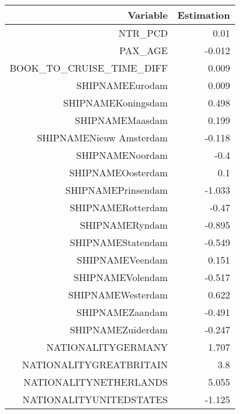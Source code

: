 \documentclass{article}
\begin{document}
\begin{table}[H]
	\centering 
	\begin{tabular}{rr}
		Variable & Estimation \\
		\hline 
		\hline 
		NTR\_PCD         	  &         0.01            \\      
		PAX\_AGE              	  &           -0.012        \\          
		BOOK\_TO\_CRUISE\_TIME\_DIFF  &              0.009      \\            
		SHIPNAMEEurodam	          &        0.009            \\      
		SHIPNAMEKoningsdam	  &         0.498           \\       
		SHIPNAMEMaasdam           &      	0.199       \\           
		SHIPNAMENieuw Amsterdam   &      	-0.118      \\            
		SHIPNAMENoordam	          &           -0.4          \\        
		SHIPNAMEOosterdam	  &          0.1            \\      
		SHIPNAMEPrinsendam	  &        -1.033           \\       
		SHIPNAMERotterdam         &    	-0.47               \\   
		SHIPNAMERyndam	          &         -0.895          \\        
		SHIPNAMEStatendam	  &         -0.549          \\        
		SHIPNAMEVeendam	          &         0.151           \\                            
		SHIPNAMEVolendam	  &       -0.517            \\                           
		SHIPNAMEWesterdam	  &       0.622             \\                          
		SHIPNAMEZaandam	          &     -0.491              \\                         
		SHIPNAMEZuiderdam	  &       -0.247            \\                           
		NATIONALITYGERMANY        &       1.707             \\                          
		NATIONALITYGREATBRITAIN	  &        3.8              \\                         
		NATIONALITYNETHERLANDS	  &       5.055             \\                          
		NATIONALITYUNITEDSTATES   & 	-1.125              \\                         

\end{tabular}
\end{table}
\end{document}

